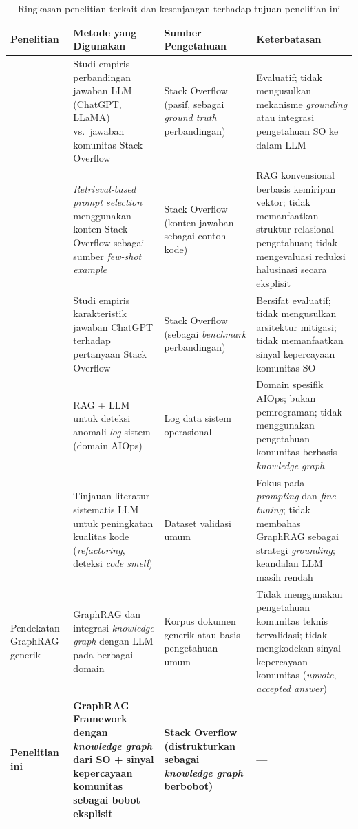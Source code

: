 

\begin{table}[!htbp]
\centering
\caption{Ringkasan penelitian terkait dan kesenjangan terhadap tujuan penelitian ini}
\label{tab:research_gap}
\small
\begin{tabular}{|p{3.0cm}|p{3.5cm}|p{3.5cm}|p{3.5cm}|}
\hline
\textbf{Penelitian} & \textbf{Metode yang Digunakan} & \textbf{Sumber Pengetahuan} & \textbf{Keterbatasan} \\
\hline
\textcite{DaSilva2025} &
Studi empiris perbandingan jawaban LLM (ChatGPT, LLaMA) vs.\ jawaban komunitas Stack Overflow &
Stack Overflow (pasif, sebagai \emph{ground truth} perbandingan) &
Evaluatif; tidak mengusulkan mekanisme \emph{grounding} atau integrasi pengetahuan SO ke dalam LLM \\
\hline
\textcite{Nashid2023} &
\emph{Retrieval-based prompt selection} menggunakan konten Stack Overflow sebagai sumber \emph{few-shot example} &
Stack Overflow (konten jawaban sebagai contoh kode) &
RAG konvensional berbasis kemiripan vektor; tidak memanfaatkan struktur relasional pengetahuan; tidak mengevaluasi reduksi halusinasi secara eksplisit \\
\hline
\textcite{Kabir2024} &
Studi empiris karakteristik jawaban ChatGPT terhadap pertanyaan Stack Overflow &
Stack Overflow (sebagai \emph{benchmark} perbandingan) &
Bersifat evaluatif; tidak mengusulkan arsitektur mitigasi; tidak memanfaatkan sinyal kepercayaan komunitas SO \\
\hline
\textcite{DelaCruzCabello2025} &
RAG + LLM untuk deteksi anomali \emph{log} sistem (domain AIOps) &
Log data sistem operasional &
Domain spesifik AIOps; bukan pemrograman; tidak menggunakan pengetahuan komunitas berbasis \emph{knowledge graph} \\
\hline
\textcite{Alomari2026} &
Tinjauan literatur sistematis LLM untuk peningkatan kualitas kode (\emph{refactoring}, deteksi \emph{code smell}) &
Dataset validasi umum &
Fokus pada \emph{prompting} dan \emph{fine-tuning}; tidak membahas GraphRAG sebagai strategi \emph{grounding}; keandalan LLM masih rendah \\
\hline
Pendekatan GraphRAG generik \autocite{Zhu2026, Pan2024} &
GraphRAG dan integrasi \emph{knowledge graph} dengan LLM pada berbagai domain &
Korpus dokumen generik atau basis pengetahuan umum &
Tidak menggunakan pengetahuan komunitas teknis tervalidasi; tidak mengkodekan sinyal kepercayaan komunitas (\emph{upvote}, \emph{accepted answer}) \\
\hline
\textbf{Penelitian ini} &
\textbf{GraphRAG Framework dengan \emph{knowledge graph} dari SO + sinyal kepercayaan komunitas sebagai bobot eksplisit} &
\textbf{Stack Overflow (distrukturkan sebagai \emph{knowledge graph} berbobot)} &
\textbf{---} \\
\hline
\end{tabular}
\end{table}